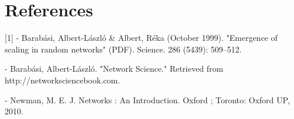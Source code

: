 \documentclass{article}
\begin{document}
\section{References}
[1] - Barabási, Albert-László & Albert, Réka (October 1999). "Emergence of scaling in random networks" (PDF). Science. 286 (5439): 509–512.

\noindent
[2] - Barabási, Albert-László. "Network Science." Retrieved from http://networksciencebook.com.

\noindent
[3] - Newman, M. E. J. Networks : An Introduction. Oxford ; Toronto: Oxford UP, 2010.
\end{document}
